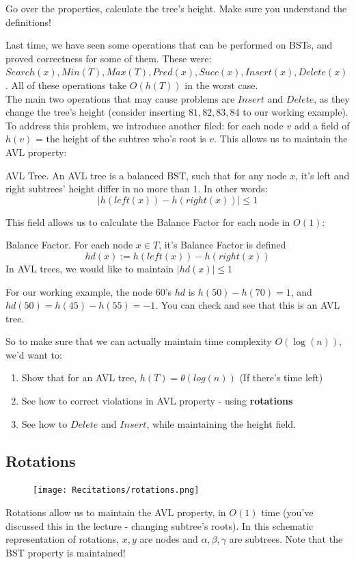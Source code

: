 \begin{remark} Go over the properties, calculate the tree's height. Make sure you
understand the definitions!
\end{remark}

Last time, we have seen some operations that can be performed on BSTs, and
proved correctness for some of them. These were: $Search(x), Min(T), Max(T), Pred(x), Succ(x),
Insert(x), Delete(x)$. All of these operations take $O(h(T))$ in the worst case.\\

The main two operations that may cause problems are $Insert$ and $Delete$, as
they change the tree's height (consider inserting $81,82,83,84$ to our
working example).
To address this problem, we introduce another filed: for each node $v$ add a
field of $h(v)$ = the height of the subtree who's root is $v$. This allows us
to maintain the AVL property:
\begin{defbox}{AVL Tree.} An AVL tree is a balanced BST, such that for any node $x$, it's left
    and right subtrees' height differ in no more than $1$. In other words:
        $$|h(left(x)) - h(right(x))|\leq 1$$
    \end{defbox}
    This field allows us to calculate the Balance Factor for each node in $O
    (1)$:
    \begin{defbox}{Balance Factor.} For each node $x\in T$, it's Balance Factor is defined 
    $$hd
    (x) := h(left(x)) - h(right(x))$$ In AVL trees, we would like to maintain
    $|hd(x)| \leq 1$
    \end{defbox}
\begin{example} For our working example, the node $60$'s $hd$ is $h(50) - h
(70) = 1$, and $hd(50) = h(45)- h(55) = -1$. You can check and see that this
is an AVL tree.
\end{example}
So to make sure that we can actually maintain time complexity $O(\log(n))$, 
we'd want to:
\begin{enumerate}
    \item Show that for an AVL tree, $h(T) = \theta(log(n))$ (If there's time
    left)
    \item See how to correct violations in AVL property - using \textbf{rotations}
    \item See how to $Delete$ and $Insert$, while maintaining the height field.
\end{enumerate}

\subsection{Rotations}
\begin{figure}[h]
  \centering
\texttt{[image: Recitations/rotations.png]}\\
\end{figure}
Rotations allow us to maintain the AVL property, in $O(1)$ time (you've
discussed this in the lecture - changing subtree's roots).
In
this
schematic
representation of rotations, $x,y$ are nodes and $\alpha,\beta,\gamma$ are subtrees.
Note that the BST property is maintained! \\

